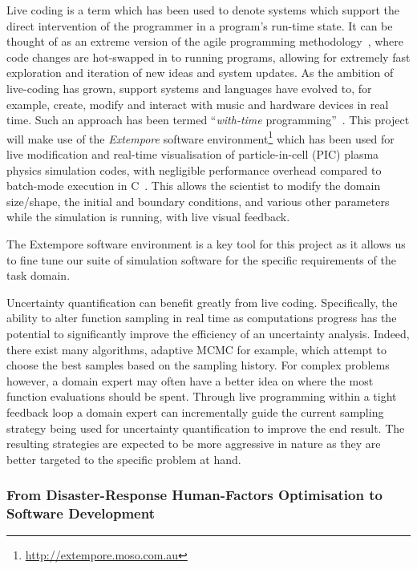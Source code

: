 \documentclass[a4paper,fontsize=12pt]{scrartcl}
\begin{document}
Live coding is a term which has been used to denote systems which
support the direct intervention of the programmer in a program's
run-time state. It can be thought of as an extreme version of the
agile programming methodology~\parencite{fowler_agile_2001}, where
code changes are hot-swapped in to running programs, allowing for
extremely fast exploration and iteration of new ideas and system
updates. As the ambition of live-coding has grown, support systems and
languages have evolved to, for example, create, modify and interact
with music and hardware devices in real time. Such an approach has
been termed ``\emph{with-time}
programming''~\parencite{sorensen2010programming}. This project will
make use of the \emph{Extempore} software
environment\footnote{\url{http://extempore.moso.com.au}} which has
been used for live modification and real-time visualisation of
particle-in-cell (PIC) plasma physics simulation codes, with
negligible performance overhead compared to batch-mode execution in
C~\parencite{swift_live_2016}. This allows the scientist to modify the
domain size/shape, the initial and boundary conditions, and various
other parameters while the simulation is running, with live visual
feedback.

The Extempore software environment is a key tool for this project as
it allows us to fine tune our suite of simulation software for the
specific requirements of the task domain.

Uncertainty quantification can benefit greatly from live coding. Specifically, the
ability to alter function sampling in real time as computations progress
has the potential to significantly improve the efficiency of an uncertainty analysis.
Indeed, there exist many algorithms, adaptive MCMC for example, which attempt to 
choose the best samples based on the sampling history. 
For complex problems however, a domain expert may often have a better idea
on where the most function evaluations should be spent.
Through live programming within a tight feedback loop a domain expert can
incrementally guide the current sampling strategy being used for uncertainty 
quantification to improve the end result.
The resulting strategies are expected to be more aggressive in nature as they 
are better targeted to the specific problem at hand.


\subsubsection*{From Disaster-Response Human-Factors Optimisation to Software Development}
\end{document}
